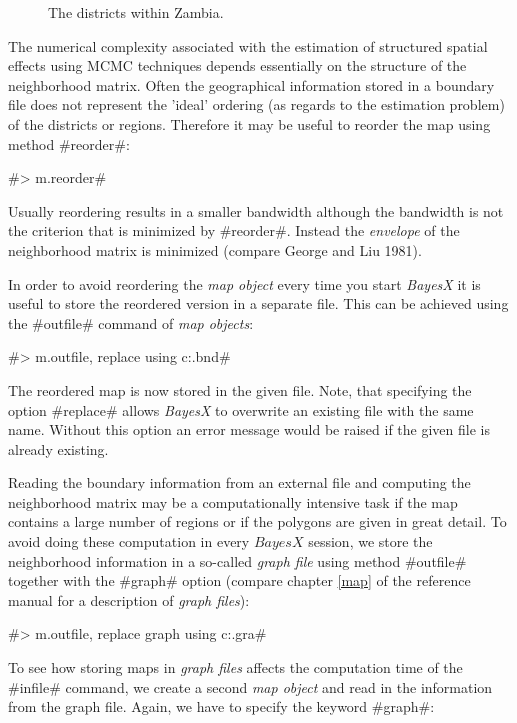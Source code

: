 \documentclass[11pt,a4paper,twoside]{bayesxreport}
\begin{document}
\begin{figure}[ht]
\begin{center}
 {\it\caption{The
districts within Zambia.\label{zambia_mcmc_zambiamap}}}
\end{center}
\end{figure}


The numerical complexity associated with the estimation of
structured spatial effects using MCMC techniques depends essentially
on the structure of the neighborhood matrix. Often the geographical
information stored in a boundary file does not represent the 'ideal'
ordering (as regards to the estimation problem) of the districts or
regions. Therefore it may be useful to reorder the map using method
#reorder#:

#> m.reorder#

Usually reordering results in a smaller bandwidth although the
bandwidth is not the criterion that is minimized by #reorder#.
Instead the {\it envelope} of the neighborhood matrix is minimized
(compare George and Liu 1981).

In order to avoid reordering the {\it map object} every time you
start {\it BayesX} it is useful to store the reordered version in a
separate file. This can be achieved using the #outfile# command of
{\it map objects}:

#> m.outfile, replace using c:\data\zambiasort.bnd#

The reordered map is now stored in the given file. Note, that
specifying the option #replace# allows {\it BayesX} to overwrite an
existing file with the same name. Without this option an error
message would be raised if the given file is already existing.

Reading the boundary information from an external file and computing
the neighborhood matrix may be a computationally intensive task if
the map contains a large number of regions or if the polygons are
given in great detail. To avoid doing these computation in every
$BayesX$ session, we store the neighborhood information in a
so-called {\it graph file} using method #outfile# together with the
#graph# option (compare chapter \ref*{map} of the reference manual
for a description of {\em graph files}):

#> m.outfile, replace graph using c:\data\zambiasort.gra#

To see how storing maps in {\it graph files} affects the computation
time of the #infile# command, we create a second {\it map object}
and read in the information from the graph file. Again, we have to
specify the keyword #graph#:
\end{document}
